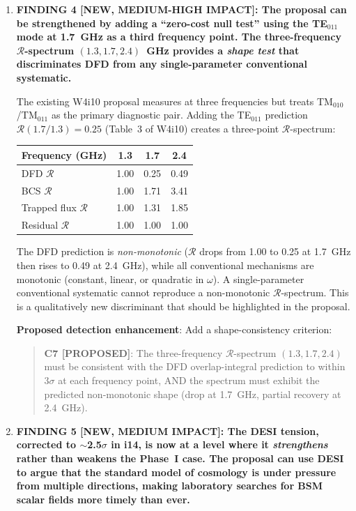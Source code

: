 \documentclass[11pt]{article}
\theoremstyle{definition}
\theoremstyle{remark}
\begin{document}
\begin{tcolorbox}[colback=blue!5!white, colframe=blue!60!black,
  title=\textbf{W4i15 TOP 5 FINDINGS --- Ranked by Programme Impact}]
\begin{enumerate}
Every step is derived from the action principle. No step invokes
$\omega^2$ scaling. The derivation chain is now closed.

\item \textbf{FINDING 4 [NEW, MEDIUM-HIGH IMPACT]: The proposal can
be strengthened by adding a ``zero-cost null test'' using the TE$_{011}$
mode at 1.7~GHz as a third frequency point. The three-frequency
$\mathcal{R}$-spectrum $(1.3, 1.7, 2.4)$~GHz provides a
\emph{shape test} that discriminates DFD from any single-parameter
conventional systematic.}

The existing W4i10 proposal measures at three frequencies but treats
TM$_{010}$/TM$_{011}$ as the primary diagnostic pair. Adding the
TE$_{011}$ prediction $\mathcal{R}(1.7/1.3) = 0.25$ (Table~3 of
W4i10) creates a three-point $\mathcal{R}$-spectrum:

\begin{center}
\begin{tabular}{lccc}
\toprule
Frequency (GHz) & 1.3 & 1.7 & 2.4 \\
\midrule
DFD $\mathcal{R}$ & 1.00 & 0.25 & 0.49 \\
BCS $\mathcal{R}$ & 1.00 & 1.71 & 3.41 \\
Trapped flux $\mathcal{R}$ & 1.00 & 1.31 & 1.85 \\
Residual $\mathcal{R}$ & 1.00 & 1.00 & 1.00 \\
\bottomrule
\end{tabular}
\end{center}

The DFD prediction is \emph{non-monotonic} ($\mathcal{R}$ drops from
1.00 to 0.25 at 1.7~GHz then rises to 0.49 at 2.4~GHz), while all
conventional mechanisms are monotonic (constant, linear, or quadratic
in $\omega$). A single-parameter conventional systematic cannot
reproduce a non-monotonic $\mathcal{R}$-spectrum. This is a
qualitatively new discriminant that should be highlighted in the
proposal.

\textbf{Proposed detection enhancement}: Add a shape-consistency
criterion:
\begin{quote}
\textbf{C7 [PROPOSED]}: The three-frequency $\mathcal{R}$-spectrum
$(1.3, 1.7, 2.4)$ must be consistent with the DFD overlap-integral
prediction to within $3\sigma$ at each frequency point, AND the
spectrum must exhibit the predicted non-monotonic shape (drop at
1.7~GHz, partial recovery at 2.4~GHz).
\end{quote}

\item \textbf{FINDING 5 [NEW, MEDIUM IMPACT]: The DESI tension,
corrected to $\sim$2.5$\sigma$ in i14, is now at a level where
it \emph{strengthens} rather than weakens the Phase~I case.
The proposal can use DESI to argue that the standard model of
cosmology is under pressure from multiple directions, making
laboratory searches for BSM scalar fields more timely than ever.}


\end{enumerate}
\end{tcolorbox}
\end{document}
